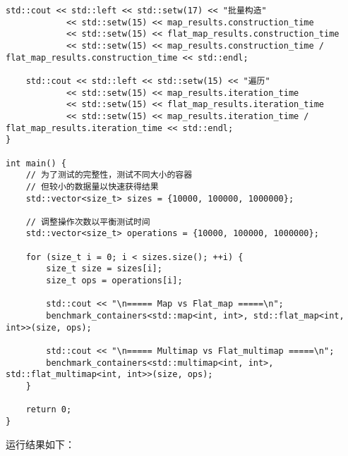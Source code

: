 \documentclass[a4paper, 12pt]{article}
\begin{document}
\begin{lstlisting}[style=cpp]
    std::cout << std::left << std::setw(17) << "批量构造" 
            << std::setw(15) << map_results.construction_time
            << std::setw(15) << flat_map_results.construction_time
            << std::setw(15) << map_results.construction_time / flat_map_results.construction_time << std::endl;
            
    std::cout << std::left << std::setw(15) << "遍历" 
            << std::setw(15) << map_results.iteration_time
            << std::setw(15) << flat_map_results.iteration_time
            << std::setw(15) << map_results.iteration_time / flat_map_results.iteration_time << std::endl;
}

int main() {
    // 为了测试的完整性，测试不同大小的容器
    // 但较小的数据量以快速获得结果
    std::vector<size_t> sizes = {10000, 100000, 1000000};
    
    // 调整操作次数以平衡测试时间
    std::vector<size_t> operations = {10000, 100000, 1000000};
    
    for (size_t i = 0; i < sizes.size(); ++i) {
        size_t size = sizes[i];
        size_t ops = operations[i];
        
        std::cout << "\n===== Map vs Flat_map =====\n";
        benchmark_containers<std::map<int, int>, std::flat_map<int, int>>(size, ops);
        
        std::cout << "\n===== Multimap vs Flat_multimap =====\n";
        benchmark_containers<std::multimap<int, int>, std::flat_multimap<int, int>>(size, ops);
    }
    
    return 0;
}
\end{lstlisting}

运行结果如下：
\end{document}
